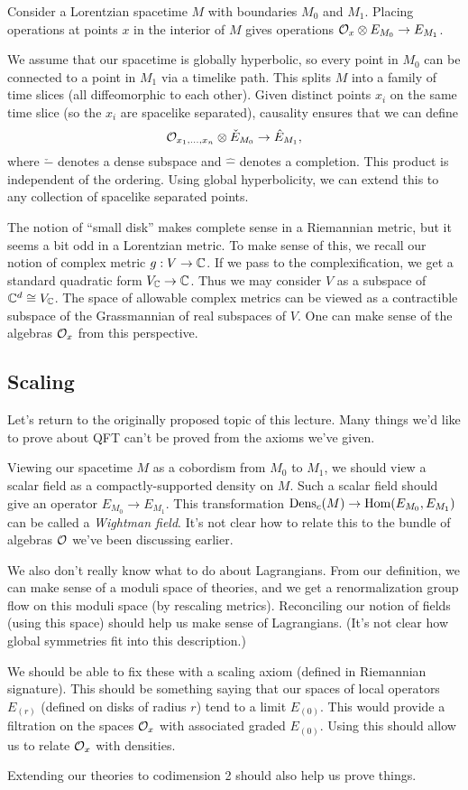Consider a Lorentzian spacetime $M$ with boundaries $M_0$ and $M_1$.
Placing operations at points $x$ in the interior of $M$ gives operations $\mathcal{O}_x \otimes E_{M_0} \to E_{M_1}$.

We assume that our spacetime is globally hyperbolic, so every point in $M_0$ can be connected to a point in $M_1$ via a timelike path.
This splits $M$ into a family of time slices (all diffeomorphic to each other).
Given distinct points $x_i$ on the same time slice (so the $x_i$ are spacelike separated), causality ensures that we can define
\[
	\mathcal{O}_{x_1, \dots, x_n} \otimes \check{E}_{M_0} \to \hat{E}_{M_1},
\]
where $\check{-}$ denotes a dense subspace and $\hat{-}$ denotes a completion.
This product is independent of the ordering.
Using global hyperbolicity, we can extend this to any collection of spacelike separated points.

The notion of ``small disk'' makes complete sense in a Riemannian metric, but it seems a bit odd in a Lorentzian metric.
To make sense of this, we recall our notion of complex metric $g: V \to \mathbb{C}$.
If we pass to the complexification, we get a standard quadratic form $V_{\mathbb{C}} \to \mathbb{C}$.
Thus we may consider $V$ as a subspace of $\mathbb{C}^d \cong V_{\mathbb{C}}$.
The space of allowable complex metrics can be viewed as a contractible subspace of the Grassmannian of real subspaces of $V$.
One can make sense of the algebras $\mathcal{O}_x$ from this perspective.

\subsection{Scaling}

Let's return to the originally proposed topic of this lecture.
Many things we'd like to prove about QFT can't be proved from the axioms we've given.

Viewing our spacetime $M$ as a cobordism from $M_0$ to $M_1$, we should view a scalar field as a compactly-supported density on $M$.
Such a scalar field should give an operator $E_{M_0} \to E_{M_1}$.
This transformation $\operatorname{Dens}_c(M) \to \operatorname{Hom}(E_{M_0}, E_{M_1})$ can be called a \emph{Wightman field}.
It's not clear how to relate this to the bundle of algebras $\mathcal{O}$ we've been discussing earlier.

We also don't really know what to do about Lagrangians.
From our definition, we can make sense of a moduli space of theories, and we get a renormalization group flow on this moduli space (by rescaling metrics).
Reconciling our notion of fields (using this space) should help us make sense of Lagrangians.
(It's not clear how global symmetries fit into this description.)

We should be able to fix these with a scaling axiom (defined in Riemannian signature).
This should be something saying that our spaces of local operators $E_{(r)}$ (defined on disks of radius $r$) tend to a limit $E_{(0)}$.
This would provide a filtration on the spaces $\mathcal{O}_x$ with associated graded $E_{(0)}$.
Using this should allow us to relate $\mathcal{O}_x$ with densities.

Extending our theories to codimension 2 should also help us prove things.
